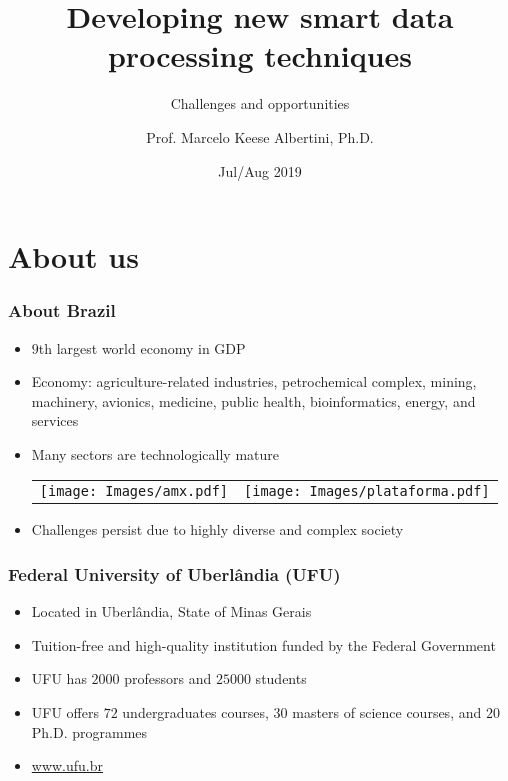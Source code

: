 \documentclass{beamer}
\title{Developing new smart data\\processing techniques}
\subtitle{Challenges and opportunities}
\author{Prof. Marcelo Keese Albertini, Ph.D.}
\institute{School of Computer Science\\ Federal University of Uberlandia, Brazil}
\date{Jul/Aug 2019}
\begin{document}
\begin{frame}
	\maketitle %
\end{frame}


\section{About us} %
{ %
\begin{frame}[plain]
\end{frame}
}

\begin{frame}\frametitle{About Brazil}
  \begin{itemize}
    \item $9$th largest world economy in GDP 
    \item Economy: agriculture-related industries, petrochemical complex, mining, machinery, avionics, medicine, public health, bioinformatics, energy, and services
    \item Many sectors are technologically mature
\centering
  \begin{tabular}{cc}
    \texttt{[image: Images/amx.pdf]} & \texttt{[image: Images/plataforma.pdf]}
  \end{tabular}
    \item Challenges persist due to highly diverse and complex society 
  \end{itemize}
\end{frame}

\begin{frame}\frametitle{Federal University of Uberlândia (UFU)}
  \begin{itemize}
    \item Located in Uberlândia, State of Minas Gerais
    \item Tuition-free and high-quality institution funded by the Federal Government
    \item UFU has $2000$ professors and $25000$ students
    \item UFU offers $72$ undergraduates courses, $30$ masters of science courses, and $20$ Ph.D. programmes
    \item \href{http://www.ufu.br}{www.ufu.br}
  \end{itemize}
\end{frame}
\end{document}
